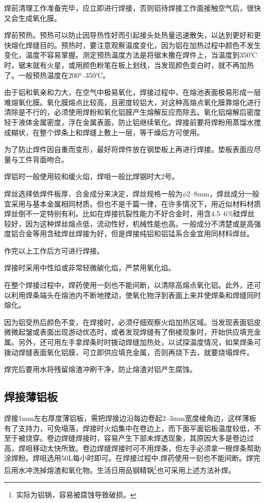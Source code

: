 \documentclass{ctexbook}
\begin{document}
焊前清理工作准备完毕，应立即进行焊接，否则铝待焊接工作面接触空气后，很快又会生成氧化膜。

焊前预热。预热可以防止因导热性好而引起接头处热量迅速散失，以达到更好和更快熔化焊缝目的。预热时，要注意观察温度变化，因为铝在加热过程中颜色不发生变化，温度不容易掌握。测定预热温度方法是将锯末撒在焊件上，当温度到350℃时，锯末就有火星，或用颜色粉笔在板上划线，当发现颜色变白时，就不再加热了。一般预热温度在200°--350℃。

由于铝和氧亲和力大，在空气中极易氧化，焊接过程中，在熔池表面极易形成一层难熔氧化膜。氧化膜熔点比较高，且密度较铝大，对这种高熔点氧化膜靠熔化进行清除是不行的，必须使用焊粉和氧化铝膜产生熔解反应而除去。氧化铝熔解后密度轻于液体金属密度，浮在金属表面，防止铝继续氧化。焊接前要将焊粉用蒸馏水搅成糊状，在整个焊条上和焊缝上敷上一层，等干燥后方可使用。

为了防止焊件因自重而变形，最好将焊件放在钢垫板上再进行焊接。垫板表面应尽量与工件背面吻合。

焊铝时一般使用较和缓火焰，焊咀一般比焊钢时大2号。

焊丝选择依焊件板厚、合金成分来决定，焊丝规格一般为$\phi$2--8mm，焊丝成分一般宜采用与基本金属相同材质。但也不是千篇一律，在许多情况下，用近似材料材质焊丝倒不一定特别有利。比如在焊接抗裂性能力不好合金时，用含4.5--6\%硅焊丝较好，因为这种焊丝熔点低，流动性好，机械性能也高。一般成分不清楚或是高强度铝合金等用含硅焊丝焊接为好，但是焊接纯铝和铝锰系合金宜用同材料焊丝。

作完以上工作后方可进行焊接。

焊接时采用中性焰或非常轻微碳化焰，严禁用氧化焰。

在整个焊接过程中，焊药使用一刻也不能间断，以清除高熔点氧化铝。此外，还可以利用焊条端头在熔池内不断地搅动，使氧化物浮到表面上来并使焊条和焊缝同时熔化。

因为铝受热后颜色不变，在焊接时，必须仔细观察火焰加热区域。当发现表面铝皮微微起皱或表面出现游动优态时，或者发现焊缝有了倒棱现象时，开始供应填充金属。另外，还可用左手拿焊条时时拨动焊缝加热处，以试探温度情况，如杲焊条可拨动焊缝表面氧化铝膜，可立即供应填充金属，否则再烧下去，就要烧塌焊件。

焊完后要用水将残留熔渣冲刷干净，防止熔渣对铝产生腐蚀。
\subsection{焊接薄铝板}
焊接1mm左右厚度薄铝板，需把焊接边沿每边卷起2--3mm宽度棱角边，这样薄板有了支持力，可免塌落，焊接时火焰集中在卷边上，而下面平面铝板温度较低，不至于被烧穿。卷边焊缝焊接时，容易产生下部未焊透现象，其原因大多是卷边过高，焊咀移动太快所致。卷边焊缝焊接时可不用焊条，但左手必须拿一根焊条帮助涂焊粉。焊咀选用50L每小时即可。在焊接过程中,焊药使用一刻也不能间断。焊完后用水冲洗掉熔渣和氧化物。生活日用品钢精锅\footnote{实际为铝锅，容易被腐蚀导致破损。}也可采用上述方法补焊。
\end{document}
